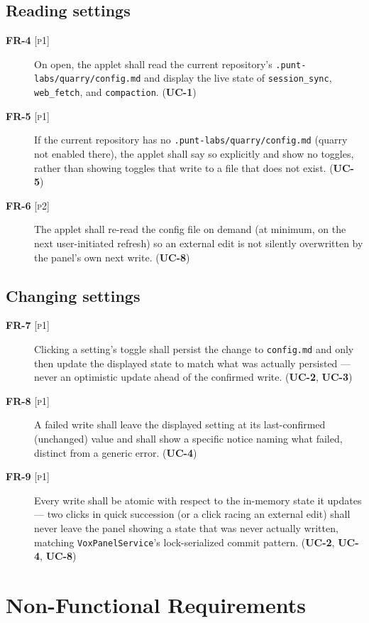 \documentclass[a4paper,11pt]{report}
\newcommand{\uc}[1]{\textbf{UC-#1}}
\newcommand{\fr}[1]{\textbf{FR-#1}}
\newcommand{\pone}{\textsc{[p1]}}
\newcommand{\ptwo}{\textsc{[p2]}}
\begin{document}
\subsection{Reading settings}

\begin{description}
  \item[\fr{4} \pone{}] On open, the applet shall read the current
    repository's \texttt{.punt-labs/quarry/config.md} and display the
    live state of \texttt{session\_sync}, \texttt{web\_fetch}, and
    \texttt{compaction}. (\uc{1})
  \item[\fr{5} \pone{}] If the current repository has no
    \texttt{.punt-labs/quarry/config.md} (quarry not enabled there), the
    applet shall say so explicitly and show no toggles, rather than
    showing toggles that write to a file that does not exist. (\uc{5})
  \item[\fr{6} \ptwo{}] The applet shall re-read the config file on
    demand (at minimum, on the next user-initiated refresh) so an
    external edit is not silently overwritten by the panel's own next
    write. (\uc{8})
\end{description}

\subsection{Changing settings}

\begin{description}
  \item[\fr{7} \pone{}] Clicking a setting's toggle shall persist the
    change to \texttt{config.md} and only then update the displayed
    state to match what was actually persisted --- never an optimistic
    update ahead of the confirmed write. (\uc{2}, \uc{3})
  \item[\fr{8} \pone{}] A failed write shall leave the displayed setting
    at its last-confirmed (unchanged) value and shall show a specific
    notice naming what failed, distinct from a generic error. (\uc{4})
  \item[\fr{9} \pone{}] Every write shall be atomic with respect to the
    in-memory state it updates --- two clicks in quick succession (or a
    click racing an external edit) shall never leave the panel showing a
    state that was never actually written, matching
    \texttt{VoxPanelService}'s lock-serialized commit pattern. (\uc{2},
    \uc{4}, \uc{8})
\end{description}

\section{Non-Functional Requirements}
\end{document}
